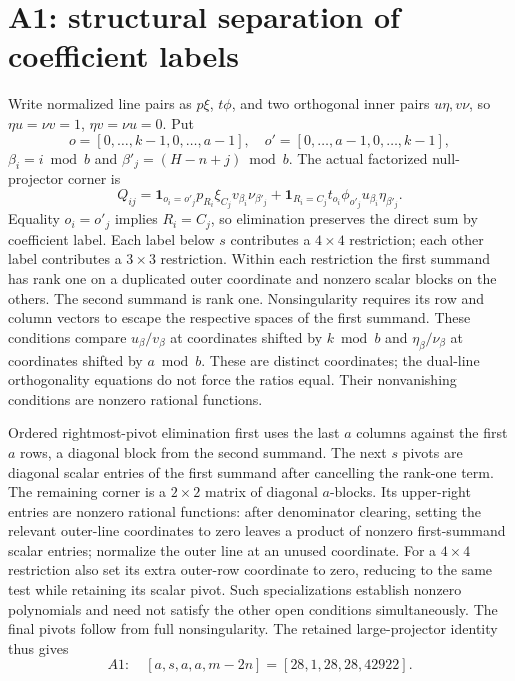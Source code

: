 \documentclass[11pt]{article}
\begin{document}
\section{A1: structural separation of coefficient labels}
Write normalized line pairs as $p\xi$, $t\phi$, and two orthogonal inner pairs $u\eta,v\nu$, so $\eta u=\nu v=1$, $\eta v=\nu u=0$. Put
\[
o=[0,\ldots,k-1,0,\ldots,a-1],\quad
o'=[0,\ldots,a-1,0,\ldots,k-1],
\]
$\beta_i=i\bmod b$ and $\beta'_j=(H-n+j)\bmod b$. The actual factorized null-projector corner is
\[
Q_{ij}=\mathbf1_{o_i=o'_j}p_{R_i}\xi_{C_j}v_{\beta_i}\nu_{\beta'_j}
 +\mathbf1_{R_i=C_j}t_{o_i}\phi_{o'_j}u_{\beta_i}\eta_{\beta'_j}.
\]
Equality $o_i=o'_j$ implies $R_i=C_j$, so elimination preserves the direct sum by coefficient label. Each label below $s$ contributes a $4\times4$ restriction; each other label contributes a $3\times3$ restriction. Within each restriction the first summand has rank one on a duplicated outer coordinate and nonzero scalar blocks on the others. The second summand is rank one. Nonsingularity requires its row and column vectors to escape the respective spaces of the first summand. These conditions compare $u_\beta/v_\beta$ at coordinates shifted by $k\bmod b$ and $\eta_\beta/\nu_\beta$ at coordinates shifted by $a\bmod b$. These are distinct coordinates; the dual-line orthogonality equations do not force the ratios equal. Their nonvanishing conditions are nonzero rational functions.

Ordered rightmost-pivot elimination first uses the last $a$ columns against the first $a$ rows, a diagonal block from the second summand. The next $s$ pivots are diagonal scalar entries of the first summand after cancelling the rank-one term. The remaining corner is a $2\times2$ matrix of diagonal $a$-blocks. Its upper-right entries are nonzero rational functions: after denominator clearing, setting the relevant outer-line coordinates to zero leaves a product of nonzero first-summand scalar entries; normalize the outer line at an unused coordinate. For a $4\times4$ restriction also set its extra outer-row coordinate to zero, reducing to the same test while retaining its scalar pivot. Such specializations establish nonzero polynomials and need not satisfy the other open conditions simultaneously. The final pivots follow from full nonsingularity. The retained large-projector identity thus gives
\[
A1:\quad [a,s,a,a,m-2n]=[28,1,28,28,42922].
\]
\end{document}
